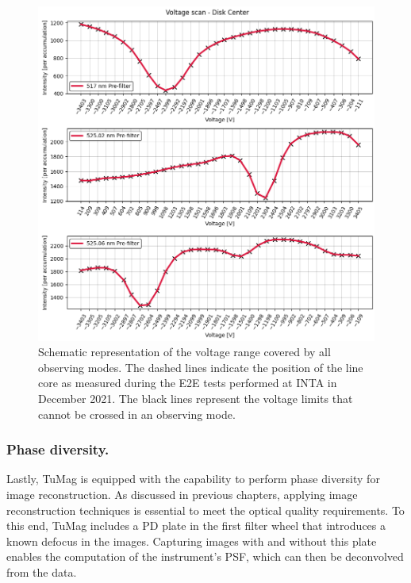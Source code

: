 \begin{figure}[t]
    \begin{minipage}[c]{0.67\textwidth}
      \includegraphics[width=\textwidth]{figures/Pipeline/Prefilter_scans.png}
    \end{minipage}\hfill
    \begin{minipage}[c]{0.29\textwidth}
      \caption{
       Schematic representation of the voltage range covered by all observing modes. The dashed lines indicate the position of the line core as measured during the E2E tests performed at INTA in December 2021. The black lines represent the voltage limits that cannot be crossed in an observing mode.
       \label{fig_pipeline:  prefilter_scans}
      } 
    \end{minipage}
  \end{figure}


\subsubsection{\label{susec: PD_measurements}Phase diversity.}

Lastly, TuMag is equipped with the capability to perform phase diversity for image reconstruction. As discussed in previous chapters, applying image reconstruction techniques is essential to meet the optical quality requirements. To this end, TuMag includes a PD plate in the first filter wheel that introduces a known defocus in the images. Capturing images with and without this plate enables the computation of the instrument's PSF, which can then be deconvolved from the data.

